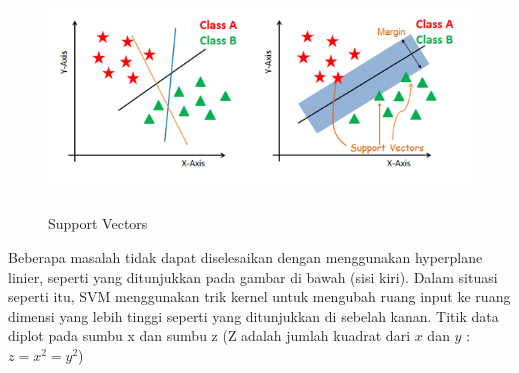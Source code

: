 \begin{figure}[H]
	\centering
	\includegraphics[width=14cm, height=6cm]{gambar/index2_ub1uzd}
	\caption{Support Vectors}
	\label{index3_souoaz}
\end{figure}
\par Beberapa masalah tidak dapat diselesaikan dengan menggunakan hyperplane linier, seperti yang ditunjukkan pada gambar di bawah (sisi kiri). Dalam situasi seperti itu, SVM menggunakan trik kernel untuk mengubah ruang input ke ruang dimensi yang lebih tinggi seperti yang ditunjukkan di sebelah kanan. Titik data diplot pada sumbu x dan sumbu z (Z adalah jumlah kuadrat dari $x$ dan $y$ : $z=x^2=y^2$)

